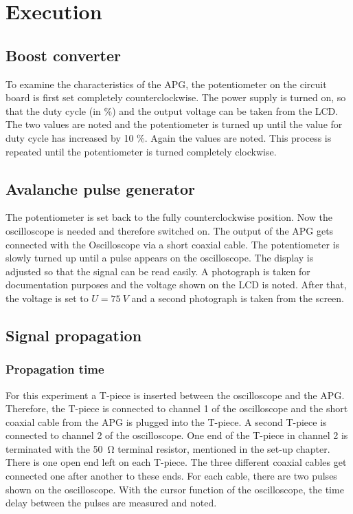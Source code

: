 \chapter{Execution}
    \section{Boost converter}\label{sec:exec:boost_conv}
        To examine the characteristics of the APG, the potentiometer on the circuit board is first set completely
        counterclockwise. The power supply is turned on, so that the duty cycle (in \%) and the output voltage can be taken from
        the LCD. The two values are noted and the potentiometer is turned up until the value for duty cycle has increased by 10 \%.
        Again the values are noted. This process is repeated until the potentiometer is turned completely clockwise.
    \section{Avalanche pulse generator}\label{sec:exec:avalanche_p_gen}
        The potentiometer is set back to the fully counterclockwise position. Now the oscilloscope is needed and therefore
        switched on. The output of the APG gets connected with the Oscilloscope via a short coaxial cable. The
        potentiometer is slowly turned up until a pulse appears on the oscilloscope. The display is adjusted so that the signal
        can be read easily. A photograph is taken for documentation purposes and the voltage shown on the LCD is noted. After
        that, the voltage is set to \(U = \SI{75}{V}\) and a second photograph is taken from the screen.
    \section{Signal propagation}\label{sec:exec:signal_prop}
        \subsection{Propagation time}\label{subsec:exec:prop_time}
            For this experiment a T-piece is inserted between the oscilloscope and the APG. Therefore, the T-piece is
            connected to channel 1 of the oscilloscope and the short coaxial cable from the APG is plugged into the
            T-piece. A second T-piece is connected to channel 2 of the oscilloscope. One end of the T-piece in channel 2 is terminated
            with the \SI{50}{\ohm} terminal resistor, mentioned in the set-up chapter. There is one open end left on each T-piece.
            The three different coaxial cables get connected one after another to these ends. For each cable, there are two pulses
            shown on the oscilloscope. With the cursor function of the oscilloscope, the time delay between the pulses are measured
            and noted.
